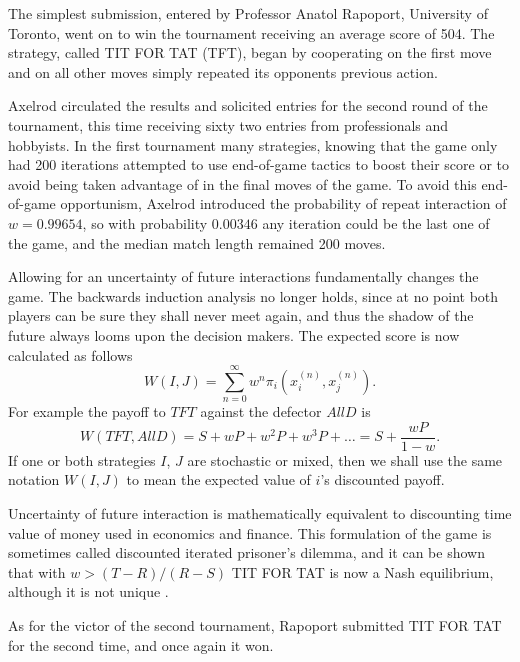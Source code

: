 The simplest submission, entered by Professor Anatol Rapoport, University of Toronto, went on to win the tournament receiving an average score of 504. The strategy, called TIT FOR TAT (TFT), began by cooperating on the first move and on all other moves simply repeated its opponents previous action.

Axelrod circulated the results and solicited entries for the second round of the tournament, this time receiving sixty two entries from professionals and hobbyists. In the first tournament many strategies, knowing that the game only had 200 iterations attempted to use end-of-game tactics to boost their score or to avoid being taken advantage of in the final moves of the game. To avoid this end-of-game opportunism, Axelrod introduced the probability of repeat interaction of $w = 0.99654$, so with probability $0.00346$ any iteration could be the last one of the game, and the median match length remained 200 moves.

Allowing for an uncertainty of future interactions fundamentally changes the game. The backwards induction analysis no longer holds, since at no point both players can be sure they shall never meet again, and thus the shadow of the future always looms upon the decision makers. The expected score is now calculated as follows
\[
W(I, J) = \sum_{n=0}^\infty w^n \pi_i(x_i^{(n)}, x_j^{(n)})
.\]
For example the payoff to $TFT$ against the defector $AllD$ is
\[
W(TFT, AllD) = S + wP + w^2P + w^3P + \dots = S + \frac{wP}{1-w}
.\]
If one or both strategies $I$, $J$ are stochastic or mixed, then we shall use the same notation $W(I, J)$ to mean the expected value of $i$'s discounted payoff.

Uncertainty of future interaction is mathematically equivalent to discounting time value of money used in economics and finance. This formulation of the game is sometimes called discounted iterated prisoner's dilemma, and it can be shown that with $w > (T-R)/(R-S)$ TIT FOR TAT is now a Nash equilibrium, although it is not unique \cite[p.207]{axelrod1984evolution}.

As for the victor of the second tournament, Rapoport submitted TIT FOR TAT for the second time, and once again it won.
\\
\\

